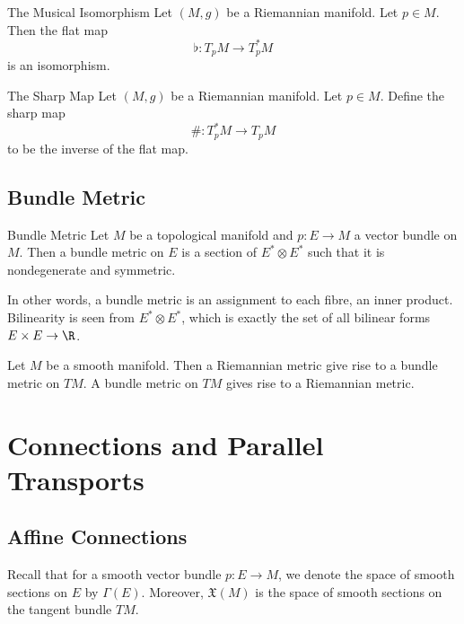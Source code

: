 \documentclass[a4paper]{article}
\begin{document}
\begin{thm}{The Musical Isomorphism}{} Let $(M,g)$ be a Riemannian manifold. Let $p\in M$. Then the flat map $$\flat:T_pM\to T_p^\ast M$$ is an isomorphism. 
\end{thm}

\begin{defn}{The Sharp Map}{} Let $(M,g)$ be a Riemannian manifold. Let $p\in M$. Define the sharp map $$\#:T_p^\ast M\to T_pM$$ to be the inverse of the flat map. 
\end{defn}

\subsection{Bundle Metric}
\begin{defn}{Bundle Metric}{} Let $M$ be a topological manifold and $p:E\to M$ a vector bundle on $M$. Then a bundle metric on $E$ is a section of $E^\ast\otimes E^\ast$ such that it is nondegenerate and symmetric. 
\end{defn}

In other words, a bundle metric is an assignment to each fibre, an inner product. Bilinearity is seen from $E^\ast\otimes E^\ast$, which is exactly the set of all bilinear forms $E\times E\to\R$. 

\begin{prp}{}{} Let $M$ be a smooth manifold. Then a Riemannian metric give rise to a bundle metric on $TM$. A bundle metric on $TM$ gives rise to a Riemannian metric. 
\end{prp}

\pagebreak
\section{Connections and Parallel Transports}
\subsection{Affine Connections}
Recall that for a smooth vector bundle $p:E\to M$, we denote the space of smooth sections on $E$ by $\Gamma(E)$. Moreover, $\mathfrak{X}(M)$ is the space of smooth sections on the tangent bundle $TM$. 
\end{document}

